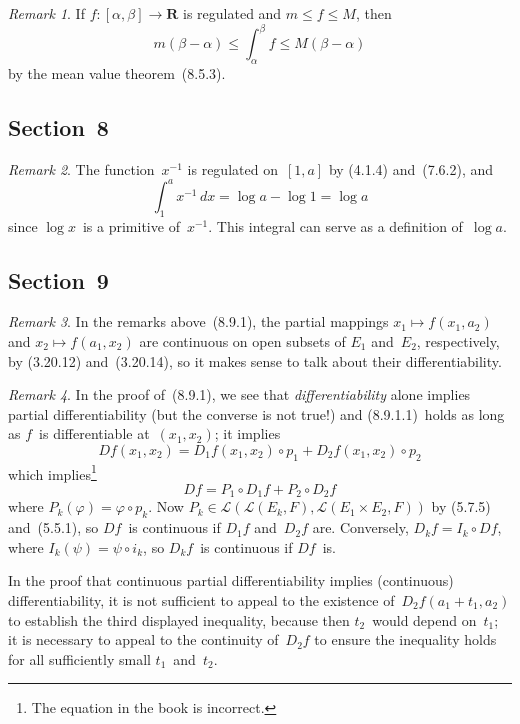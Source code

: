 \documentclass[letterpaper,12pt]{article}
\newcommand{\R}{\mathbf{R}}
\renewcommand{\L}{\mathcal{L}}
\newcommand{\after}{\circ}
\newcommand{\inv}[1]{#1^{-1}}
\renewcommand{\d}[1]{\,d\!{#1}}
\newcommand{\dx}{\d{x}}
\theoremstyle{plain}
\theoremstyle{definition}
\theoremstyle{remark}
\newtheorem*{rmk}{Remark}
\begin{document}
\begin{rmk}
If \(f:[\alpha,\beta]\to\R\) is regulated and \(m\le f\le M\), then
\[m(\beta-\alpha)\le\int_{\alpha}^\beta f\le M(\beta-\alpha)\]
by the mean value theorem~(8.5.3).
\end{rmk}

\subsection*{Section~8}
\begin{rmk}
The function~\(\inv{x}\) is regulated on~\([1,a]\) by (4.1.4) and~(7.6.2), and
\[\int_1^a\inv{x}\dx=\log a-\log 1=\log a\]
since \(\log x\)~is a primitive of~\(\inv{x}\). This integral can serve as a definition of~\(\log a\).
\end{rmk}

\subsection*{Section~9}
\begin{rmk}
In the remarks above~(8.9.1), the partial mappings \(x_1\mapsto f(x_1,a_2)\) and \(x_2\mapsto f(a_1,x_2)\) are continuous on open subsets of \(E_1\) and~\(E_2\), respectively, by (3.20.12) and~(3.20.14), so it makes sense to talk about their differentiability.
\end{rmk}

\begin{rmk}
In the proof of~(8.9.1), we see that \emph{differentiability} alone implies partial differentiability (but the converse is not true!) and (8.9.1.1)~holds as long as \(f\)~is differentiable at~\((x_1,x_2)\); it implies
\[Df(x_1,x_2)=D_1f(x_1,x_2)\after p_1+D_2f(x_1,x_2)\after p_2\]
which implies\footnote{The equation in the book is incorrect.}
\[Df=P_1\after D_1f+P_2\after D_2f\]
where \(P_k(\varphi)=\varphi\after p_k\). Now \(P_k\in\L(\L(E_k,F),\L(E_1\times E_2,F))\) by (5.7.5) and~(5.5.1), so \(Df\)~is continuous if \(D_1f\) and~\(D_2f\) are. Conversely, \(D_kf=I_k\after Df\), where \(I_k(\psi)=\psi\after i_k\), so \(D_kf\)~is continuous if \(Df\)~is.

In the proof that continuous partial differentiability implies (continuous) differentiability, it is not sufficient to appeal to the existence of~\(D_2f(a_1+t_1,a_2)\) to establish the third displayed inequality, because then \(t_2\)~would depend on~\(t_1\); it is necessary to appeal to the continuity of~\(D_2f\) to ensure the inequality holds for all sufficiently small \(t_1\)~and~\(t_2\).
\end{rmk}
\end{document}
